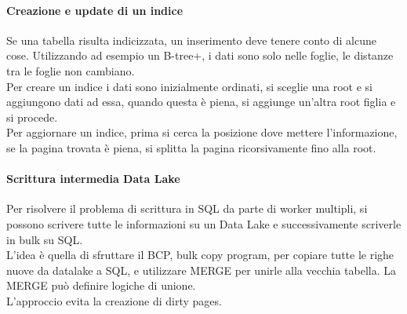 \paragraph{Creazione e update di un indice}
Se una tabella risulta indicizzata, un inserimento deve tenere conto 
di alcune cose.
Utilizzando ad esempio un B-tree+, i dati sono solo nelle foglie, le distanze tra le 
foglie non cambiano.\\
Per creare un indice i dati sono inizialmente ordinati, si sceglie una root e si 
aggiungono dati ad essa, quando questa è piena, si aggiunge un'altra root figlia e si procede.\\
Per aggiornare un indice, prima si cerca la posizione dove mettere l'informazione, 
se la pagina trovata è piena, si splitta la pagina ricorsivamente fino alla root.

\paragraph{Scrittura intermedia Data Lake}
Per risolvere il problema di scrittura in SQL da parte di worker multipli, si possono 
scrivere tutte le informazioni su un Data Lake e successivamente scriverle in bulk su SQL.\\
L'idea è quella di sfruttare il BCP, bulk copy program, per copiare tutte le righe nuove 
da datalake a SQL, e utilizzare MERGE per unirle alla vecchia tabella. La MERGE può definire 
logiche di unione.\\
L'approccio evita la creazione di dirty pages.